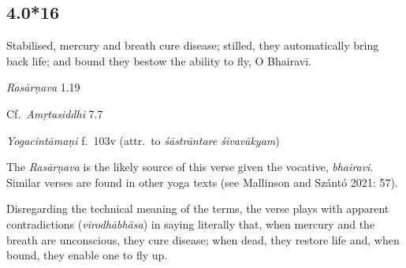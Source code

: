 \begin{ekdosis}

\subsection*{4.0*16}
\begin{translation}[hp04_000_16]
Stabilised, mercury and breath cure disease; stilled, they automatically bring back life; and bound they bestow the ability to fly, O Bhairavī.
\end{translation}

\begin{sources}[hp04_000_16]
\emph{Rasārṇava} 1.19
\begin{versinnote}
\end{versinnote}

Cf.~\emph{Amṛtasiddhi} 7.7
\begin{versinnote}
\end{versinnote}
\end{sources}

\begin{testimonia}[hp04_000_16]
\emph{Yogacintāmaṇi} f.~103v (attr.~to \emph{śāstrāntare śivavākyam})
\begin{versinnote}
\end{versinnote}
\end{testimonia}

\begin{philcomm}[hp04_000_16]
The \emph{Rasārṇava} is the likely source of this verse given the vocative, \emph{bhairavi}. Similar verses are found in other yoga texts (see Mallinson and Szántó 2021: 57).

Disregarding the technical meaning of the terms, the verse plays with apparent contradictions (\emph{virodhābhāsa}) in saying literally that, when mercury and the breath are unconscious, they cure disease; when dead, they restore life and, when bound, they enable one to fly up.
\end{philcomm}


\end{ekdosis}
